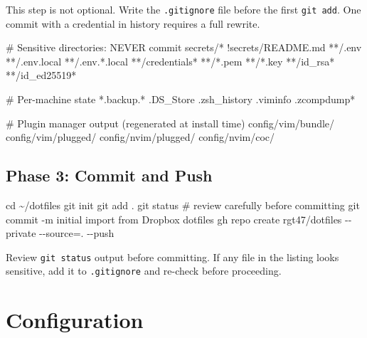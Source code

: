 \documentclass[
  11pt,
  letterpaper,
  DIV=11,
  numbers=noendperiod]{scrartcl}
\newenvironment{Shaded}{\begin{snugshade}}{\end{snugshade}}
\newcommand{\AttributeTok}[1]{\textcolor[rgb]{0.40,0.45,0.13}{#1}}
\newcommand{\BuiltInTok}[1]{\textcolor[rgb]{0.00,0.23,0.31}{#1}}
\newcommand{\CommentTok}[1]{\textcolor[rgb]{0.37,0.37,0.37}{#1}}
\newcommand{\ExtensionTok}[1]{\textcolor[rgb]{0.00,0.23,0.31}{#1}}
\newcommand{\FunctionTok}[1]{\textcolor[rgb]{0.28,0.35,0.67}{#1}}
\newcommand{\NormalTok}[1]{\textcolor[rgb]{0.00,0.23,0.31}{#1}}
\newcommand{\OperatorTok}[1]{\textcolor[rgb]{0.37,0.37,0.37}{#1}}
\newcommand{\StringTok}[1]{\textcolor[rgb]{0.13,0.47,0.30}{#1}}
\begin{document}
This step is not optional. Write the \texttt{.gitignore} file before the
first \texttt{git\ add}. One commit with a credential in history
requires a full rewrite.

\begin{Shaded}
\begin{Highlighting}[]
\NormalTok{\# Sensitive directories: NEVER commit}
\NormalTok{secrets/*}
\NormalTok{!secrets/README.md}
\NormalTok{**/.env}
\NormalTok{**/.env.local}
\NormalTok{**/.env.*.local}
\NormalTok{**/credentials*}
\NormalTok{**/*.pem}
\NormalTok{**/*.key}
\NormalTok{**/id\_rsa*}
\NormalTok{**/id\_ed25519*}

\NormalTok{\# Per{-}machine state}
\NormalTok{*.backup.*}
\NormalTok{.DS\_Store}
\NormalTok{.zsh\_history}
\NormalTok{.viminfo}
\NormalTok{.zcompdump*}

\NormalTok{\# Plugin manager output (regenerated at install time)}
\NormalTok{config/vim/bundle/}
\NormalTok{config/vim/plugged/}
\NormalTok{config/nvim/plugged/}
\NormalTok{config/nvim/coc/}
\end{Highlighting}
\end{Shaded}

\subsection{Phase 3: Commit and Push}\label{phase-3-commit-and-push}

\begin{Shaded}
\begin{Highlighting}[]
\BuiltInTok{cd}\NormalTok{ \textasciitilde{}/dotfiles}
\FunctionTok{git}\NormalTok{ init}
\FunctionTok{git}\NormalTok{ add .}
\FunctionTok{git}\NormalTok{ status   }\CommentTok{\# review carefully before committing}
\FunctionTok{git}\NormalTok{ commit }\AttributeTok{{-}m} \StringTok{\textquotesingle{}initial import from Dropbox dotfiles\textquotesingle{}}
\ExtensionTok{gh}\NormalTok{ repo create rgt47/dotfiles }\AttributeTok{{-}{-}private} \AttributeTok{{-}{-}source}\OperatorTok{=}\NormalTok{. }\AttributeTok{{-}{-}push}
\end{Highlighting}
\end{Shaded}

Review \texttt{git\ status} output before committing. If any file in the
listing looks sensitive, add it to \texttt{.gitignore} and re-check
before proceeding.

\section{Configuration}\label{configuration}
\end{document}
